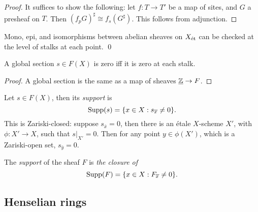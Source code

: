\documentclass[11pt]{amsart}
\begin{document}
\begin{proof}
    It suffices to show the following: let $f:T\to T'$ be a map of sites, and $G$ a presheaf on $T$. Then $(f_pG)^\sharp \cong f_s(G^\sharp)$. This follows from adjunction.
\end{proof}


\begin{prop}
    Mono, epi, and isomorphisms  between abelian sheaves on $X_{\operatorname{\acute{e}t}}$ can be checked at the level of stalks at each point. \qed
\end{prop}

\begin{cor}
    A global section $s\in F(X)$ is zero iff it is zero at each stalk.
\end{cor}

\begin{proof}
    A global section is the same as a map of sheaves $\underline{\mathbb{Z}}\to F$.
\end{proof}

\begin{defn}[support]
    Let $s\in F(X)$, then its \emph{support} is
    \[\operatorname{Supp}(s) = \{x\in X: s_{\overline{x}}\neq 0\}.\]
    This is Zariski-closed: suppose $s_{\bar{x}} = 0$, then there is an \'etale $X$-scheme $X'$, with $\phi:X'\to X$, such that $s|_{X'} = 0$. Then for any point $y\in \phi(X')$, which is a Zariski-open set, $s_{\bar{y}} = 0$.

    The \emph{support} of the sheaf $F$ is \emph{the closure of}
    \[\operatorname{Supp}(F) = \{x\in X: F_{\overline{x}} \neq 0\}.\]
\end{defn}


\subsection{Henselian rings}
\end{document}
